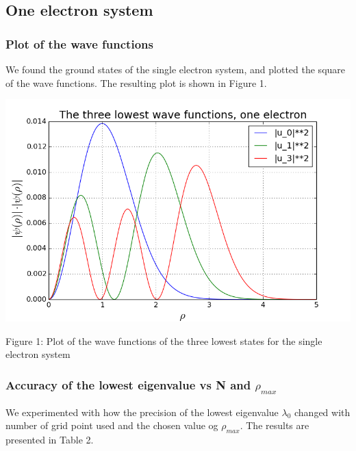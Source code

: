 \documentclass[norsk,a4paper,12pt]{article}
\begin{document}
\subsection{One electron system}\par
\vspace{3mm}

\subsubsection{Plot of the wave functions}
\vspace{3mm}
We found the ground states of the single electron system, and plotted the square of the wave functions. The resulting plot is shown in Figure 1.
\par
\vspace{3mm}

\includegraphics[scale=0.6]{wavefunc_one}\par
Figure 1: Plot of the wave functions of the three lowest states for the single electron system
\par
\vspace{5mm}

\subsubsection{Accuracy of the lowest eigenvalue vs N and $\rho_{max}$}\par
\vspace{3mm}
We experimented with how the precision of the lowest eigenvalue $\lambda_0$ changed with number of grid point used and the chosen value og $\rho_{max}$. The results are presented in Table 2.
\par
\vspace{3mm}
\end{document}
